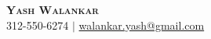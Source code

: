 \documentclass[letterpaper,11pt]{article}
\begin{document}

\textbf{\Huge \scshape Yash Walankar} \\ \vspace{1pt}
\small 312-550-6274 $|$ \href{mailto:x@x.com}{{walankar.yash@gmail.com}}








\vspace{-10pt}
\end{document}
